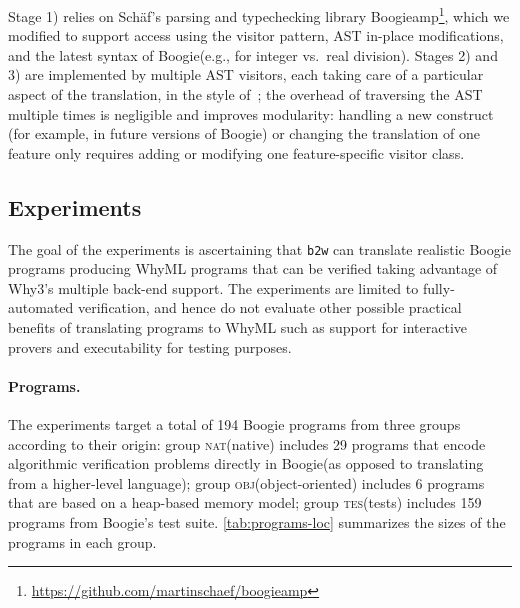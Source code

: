 \documentclass[a4paper,final]{llncs}
\makeatletter
\newif\iflong
\newcommand{\nat}{\textsc{nat}\xspace} \newcommand{\tes}{\textsc{tes}\xspace} \newcommand{\obj}{\textsc{obj}\xspace}
\newcommand{\btw}{\texttt{b2w}\xspace}
\newcommand{\Boogie}{Boogie\xspace}
\newcommand{\WhyML}{WhyML\xspace}
\newcommand{\Why}{Why3\xspace}
\newcommand{\tightParagraph}[1]{\paragraph{#1}}
\newcommand\tightParagraph{\@startsection{paragraph}{4}{\z@}{-5\p@ \@plus -4\p@ \@minus -4\p@}{-0.5em \@plus -0.22em \@minus -0.1em}{\normalfont\normalsize\itshape}}
\makeatother
\begin{document}
Stage 1) relies on Sch\"af's parsing and typechecking library Boogieamp\footnote{\url{https://github.com/martinschaef/boogieamp}}, which we modified to support access using the visitor pattern, AST in-place modifications, and the latest syntax of \Boogie (e.g., for integer vs.\ real division\iflong\footnote{\url{http://boogie.codeplex.com/discussions/397357}}\fi).
Stages 2) and 3) are implemented by multiple AST visitors, each taking care of a particular aspect of the translation, in the style of~\cite{TFNMO12-WCRE12}; the overhead of traversing the AST multiple times is negligible and improves modularity: handling a new construct (for example, in future versions of \Boogie) or changing the translation of one feature only requires adding or modifying one feature-specific visitor class.{} \iflong{A similar technique is also advocated in~\cite{SarkarWD05}.}\fi




\subsection{Experiments}

The goal of the experiments is ascertaining that \btw can translate realistic \Boogie programs producing \WhyML programs that can be verified taking advantage of \Why's multiple back-end support.
The experiments are limited to fully-automated verification, and hence do not evaluate other possible practical benefits of translating programs to \WhyML such as support for interactive provers and executability for testing purposes.

\tightParagraph{Programs.}
The experiments target a total of 194 \Boogie programs from three groups according to their origin: group \nat (native) includes 29 programs that encode algorithmic verification problems directly in \Boogie (as opposed to translating from a higher-level language); group \obj (object-oriented) includes 6 programs that are based on a heap-based memory model; group \tes (tests) includes 159 programs from \Boogie's test suite. \autoref{tab:programs-loc} summarizes the sizes of the programs in each group.
\end{document}
